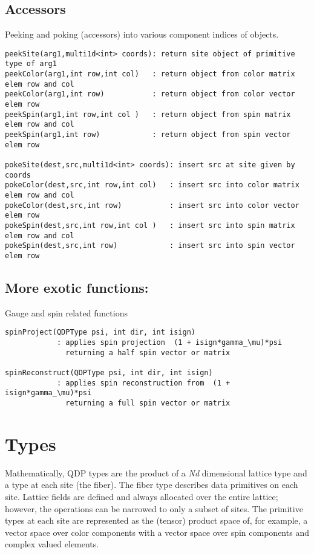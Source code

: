 \documentclass[12pt,letterpaper]{article}
\begin{document}
\medskip

\subsection{Accessors}
\label{sec:peek}

Peeking and poking (accessors) into various component indices of objects.

\begin{verbatim}
peekSite(arg1,multi1d<int> coords): return site object of primitive type of arg1
peekColor(arg1,int row,int col)   : return object from color matrix elem row and col
peekColor(arg1,int row)           : return object from color vector elem row
peekSpin(arg1,int row,int col )   : return object from spin matrix elem row and col
peekSpin(arg1,int row)            : return object from spin vector elem row

pokeSite(dest,src,multi1d<int> coords): insert src at site given by coords
pokeColor(dest,src,int row,int col)   : insert src into color matrix elem row and col
pokeColor(dest,src,int row)           : insert src into color vector elem row
pokeSpin(dest,src,int row,int col )   : insert src into spin matrix elem row and col
pokeSpin(dest,src,int row)            : insert src into spin vector elem row
\end{verbatim}


\medskip

\subsection{More exotic functions:}
\label{sec:otherfuncs}

Gauge and spin related functions

\begin{verbatim}
spinProject(QDPType psi, int dir, int isign)
		    : applies spin projection  (1 + isign*gamma_\mu)*psi
		      returning a half spin vector or matrix

spinReconstruct(QDPType psi, int dir, int isign)
		    : applies spin reconstruction from  (1 + isign*gamma_\mu)*psi
		      returning a full spin vector or matrix
\end{verbatim}

\bigskip


\newpage
\section{Types}

Mathematically, QDP types are the product of a {\em Nd} dimensional
lattice type and a type at each site (the fiber). The fiber type
describes data primitives on each site.  Lattice fields are defined
and always allocated over the entire lattice; however, the operations
can be narrowed to only a subset of sites.  The primitive types at
each site are represented as the (tensor) product space of, for
example, a vector space over color components with a vector space over
spin components and complex valued elements.
\end{document}
